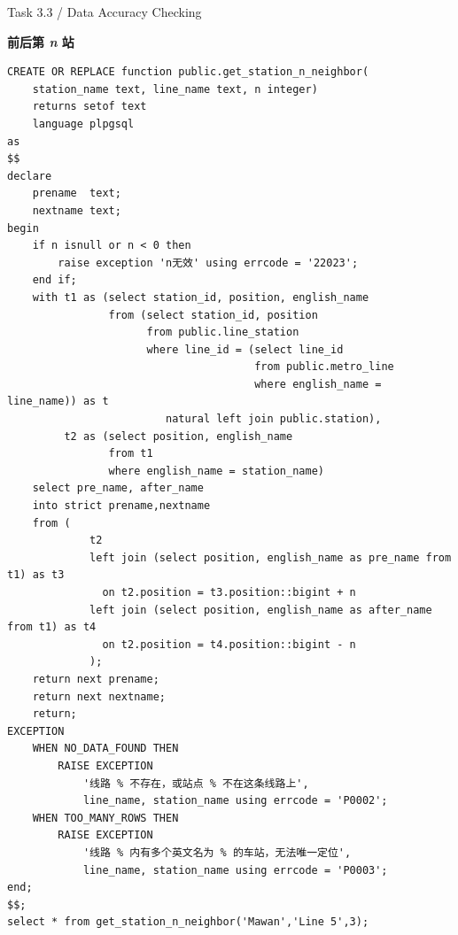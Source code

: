 \documentclass[10pt,a4paper]{article}
\newcommand{\heading}[2]{%
  {\small #1}\par\vspace{2pt}%
  {\LARGE\bfseries #2}\par\vspace{7pt}}
\newcommand{\sqltitle}[2]{\par\noindent{\small\bfseries #1\quad #2}\par}
\begin{document}
\clearpage
\heading{Task 3.3 / Data Accuracy Checking}{前后第 \textit{n} 站}
\sqltitle{Q7}{查询指定车站前后第 \textit{n} 站}
\begin{Verbatim}[fontsize=\small,breaklines=true,breakanywhere=true,breaksymbolleft={}]
CREATE OR REPLACE function public.get_station_n_neighbor(
    station_name text, line_name text, n integer)
    returns setof text
    language plpgsql
as
$$
declare
    prename  text;
    nextname text;
begin
    if n isnull or n < 0 then
        raise exception 'n无效' using errcode = '22023';
    end if;
    with t1 as (select station_id, position, english_name
                from (select station_id, position
                      from public.line_station
                      where line_id = (select line_id
                                       from public.metro_line
                                       where english_name = line_name)) as t
                         natural left join public.station),
         t2 as (select position, english_name
                from t1
                where english_name = station_name)
    select pre_name, after_name
    into strict prename,nextname
    from (
             t2
             left join (select position, english_name as pre_name from t1) as t3
               on t2.position = t3.position::bigint + n
             left join (select position, english_name as after_name from t1) as t4
               on t2.position = t4.position::bigint - n
             );
    return next prename;
    return next nextname;
    return;
EXCEPTION
    WHEN NO_DATA_FOUND THEN
        RAISE EXCEPTION
            '线路 % 不存在，或站点 % 不在这条线路上',
            line_name, station_name using errcode = 'P0002';
    WHEN TOO_MANY_ROWS THEN
        RAISE EXCEPTION
            '线路 % 内有多个英文名为 % 的车站，无法唯一定位',
            line_name, station_name using errcode = 'P0003';
end;
$$;
select * from get_station_n_neighbor('Mawan','Line 5',3);
\end{Verbatim}
\end{document}
